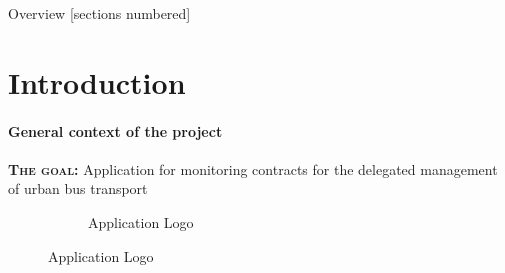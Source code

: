 \titleframe

\begin{frame}{Overview}
  [sections numbered]
  \tableofcontents[hideallsubsections]
\end{frame}


\section{Introduction}
\begin{frame}{\insertsectionhead}
  \framesubtitle{General context of the project}
\textbf{\textsc{The goal:}}\xspace Application for monitoring contracts for the delegated management of urban bus transport
\begin{figure}[ht!]
  \hspace{\fill}
  \begin{subfigure}[b]{0.3\textwidth}
    \caption*{Application Logo}
  \end{subfigure}
  \hspace{\fill}
\end{figure}
\end{frame}


